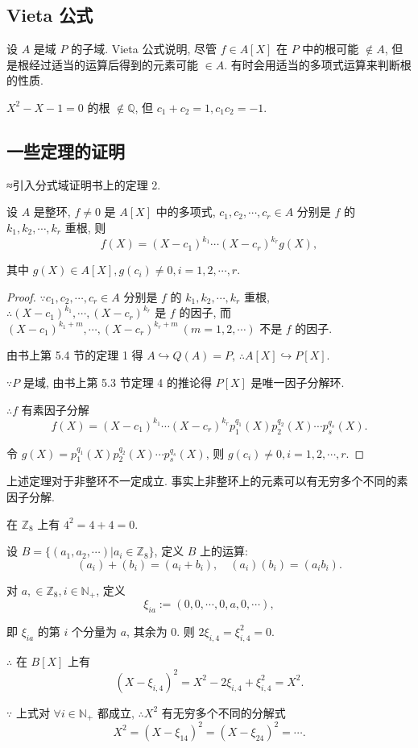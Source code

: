 \documentclass[color=black,device=normal,lang=cn,mode=geye]{elegantnote}
\begin{document}
\subsection{Vieta 公式}
设 $A$ 是域 $P$ 的子域. Vieta 公式说明, 尽管 $f\in A[X]$ 在 $P$ 中的根可能 $\notin A$, 但是根经过适当的运算后得到的元素可能 $\in A$. 有时会用适当的多项式运算来判断根的性质.
\begin{example}
    $X^2-X-1=0$ 的根 $\notin\mathbb{Q}$, 但 $c_1+c_2=1,c_1c_2=-1$.
\end{example}
\subsection{一些定理的证明}
≈引入分式域证明书上的定理 2.
\begin{theorem}[书上的定理 2]\label{t1.2b}
    设 $A$ 是整环, $f\neq0$ 是 $A[X]$ 中的多项式, $c_1,c_2,\cdots,c_r\in A$ 分别是 $f$ 的 $k_1,k_2,\cdots,k_r$ 重根, 则
    \[f(X)=(X-c_1)^{k_1}\cdots(X-c_r)^{k_r}g(X),\]

    其中 $g(X)\in A[X],g(c_i)\neq0,i=1,2,\cdots,r$.
\end{theorem}
\begin{proof}
    $\because c_1,c_2,\cdots,c_r\in A$ 分别是 $f$ 的 $k_1,k_2,\cdots,k_r$ 重根, $\therefore(X-c_1)^{k_1},\cdots,(X-c_r)^{k_r}$ 是 $f$ 的因子, 而 $(X-c_1)^{k_1+m},\cdots,(X-c_r)^{k_r+m}\ (m=1,2,\cdots)$ 不是 $f$ 的因子.

    由书上第 5.4 节的定理 1 得 $A\hookrightarrow Q(A)=P$, $\therefore A[X]\hookrightarrow P[X]$.

    $\because P$ 是域, 由书上第 5.3 节定理 4 的推论得 $P[X]$ 是唯一因子分解环.

    $\therefore f$ 有素因子分解
    \[f(X)=(X-c_1)^{k_1}\cdots(X-c_r)^{k_r}p_1^{q_1}(X)p_2^{q_2}(X)\cdots p_s^{q_s}(X).\]

    令 $g(X)=p_1^{q_1}(X)p_2^{q_2}(X)\cdots p_s^{q_s}(X)$, 则 $g(c_i)\neq0,i=1,2,\cdots,r$.
\end{proof}
上述定理对于非整环不一定成立. 事实上非整环上的元素可以有无穷多个不同的素因子分解.
\begin{example}
    在 $\mathbb{Z}_8$ 上有 $4^2=4+4=0$.

    设 $B=\{(a_1,a_2,\cdots)|a_i\in\mathbb{Z}_8\}$, 定义 $B$ 上的运算:
    \[(a_i)+(b_i)=(a_i+b_i),\quad(a_i)(b_i)=(a_ib_i).\]

    对 $a,\in\mathbb{Z}_8,i\in\mathbb{N}_+$, 定义
    \[\xi_{ia}:=(0,0,\cdots,0,a,0,\cdots),\]

    即 $\xi_{ia}$ 的第 $i$ 个分量为 $a$, 其余为 $0$. 则 $2\xi_{i,4}=\xi_{i,4}^2=0$.

    $\therefore$ 在 $B[X]$ 上有
    \[(X-\xi_{i,4})^2=X^2-2\xi_{i,4}+\xi_{i,4}^2=X^2.\]

    $\because$ 上式对 $\forall i\in\mathbb{N}_+$ 都成立, $\therefore X^2$ 有无穷多个不同的分解式
    \[X^2=(X-\xi_{14})^2=(X-\xi_{24})^2=\cdots.\]
\end{example}
\end{document}
